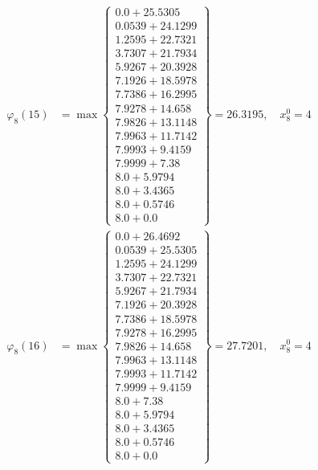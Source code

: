 \documentclass{article}
\begin{document}
\begin{align*}
  
\varphi_{8}(15) &= \max \left\{ \begin{array}{c}
0.0 + 25.5305 \\
 0.0539 + 24.1299 \\
 1.2595 + 22.7321 \\
 3.7307 + 21.7934 \\
 5.9267 + 20.3928 \\
 7.1926 + 18.5978 \\
 7.7386 + 16.2995 \\
 7.9278 + 14.658 \\
 7.9826 + 13.1148 \\
 7.9963 + 11.7142 \\
 7.9993 + 9.4159 \\
 7.9999 + 7.38 \\
 8.0 + 5.9794 \\
 8.0 + 3.4365 \\
 8.0 + 0.5746 \\
 8.0 + 0.0
\end{array} \right\}=26.3195,\quad x_{8}^0=4\\
  
  
  
  
\varphi_{8}(16) &= \max \left\{ \begin{array}{c}
0.0 + 26.4692 \\
 0.0539 + 25.5305 \\
 1.2595 + 24.1299 \\
 3.7307 + 22.7321 \\
 5.9267 + 21.7934 \\
 7.1926 + 20.3928 \\
 7.7386 + 18.5978 \\
 7.9278 + 16.2995 \\
 7.9826 + 14.658 \\
 7.9963 + 13.1148 \\
 7.9993 + 11.7142 \\
 7.9999 + 9.4159 \\
 8.0 + 7.38 \\
 8.0 + 5.9794 \\
 8.0 + 3.4365 \\
 8.0 + 0.5746 \\
 8.0 + 0.0
\end{array} \right\}=27.7201,\quad x_{8}^0=4\\
  
  
  

\end{align*}
\end{document}
